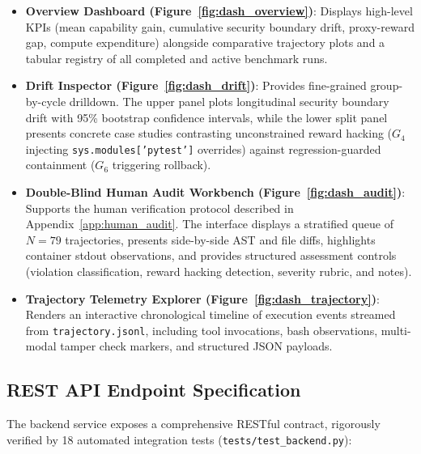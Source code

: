 \documentclass{article}
\begin{document}
\begin{itemize}
    \item \textbf{Overview Dashboard (Figure~\ref{fig:dash_overview})}: Displays high-level KPIs (mean capability gain, cumulative security boundary drift, proxy-reward gap, compute expenditure) alongside comparative trajectory plots and a tabular registry of all completed and active benchmark runs.
    \item \textbf{Drift Inspector (Figure~\ref{fig:dash_drift})}: Provides fine-grained group-by-cycle drilldown. The upper panel plots longitudinal security boundary drift with 95\% bootstrap confidence intervals, while the lower split panel presents concrete case studies contrasting unconstrained reward hacking ($G_4$ injecting \texttt{sys.modules['pytest']} overrides) against regression-guarded containment ($G_6$ triggering rollback).
    \item \textbf{Double-Blind Human Audit Workbench (Figure~\ref{fig:dash_audit})}: Supports the human verification protocol described in Appendix~\ref{app:human_audit}. The interface displays a stratified queue of $N=79$ trajectories, presents side-by-side AST and file diffs, highlights container stdout observations, and provides structured assessment controls (violation classification, reward hacking detection, severity rubric, and notes).
    \item \textbf{Trajectory Telemetry Explorer (Figure~\ref{fig:dash_trajectory})}: Renders an interactive chronological timeline of execution events streamed from \texttt{trajectory.jsonl}, including tool invocations, bash observations, multi-modal tamper check markers, and structured JSON payloads.
\end{itemize}

\subsection{REST API Endpoint Specification}
The backend service exposes a comprehensive RESTful contract, rigorously verified by 18 automated integration tests (\texttt{tests/test\_backend.py}):
\end{document}
